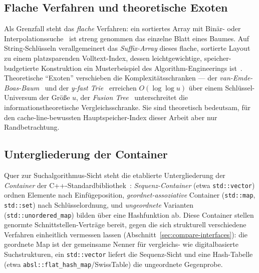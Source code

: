 \subsection{Flache Verfahren und theoretische Exoten}\label{ssec:flat-exotic}
Als Grenzfall steht das \emph{flache} Verfahren: ein sortiertes Array mit Binär- oder
Interpolationssuche~\cite{knuth1998taocp3} ist streng genommen das einzelne Blatt eines Baumes. Auf
String-Schlüsseln verallgemeinert das \emph{Suffix-Array} dieses flache, sortierte Layout zu einem
platzsparenden Volltext-Index, dessen leichtgewichtige, speicher-budgetierte Konstruktion ein
Musterbeispiel des Algorithm-Engineerings ist~\cite{manzini2002suffixarray}. Theoretische
\enquote{Exoten} verschieben die Komplexitätsschranken --- der
\emph{van-Emde-Boas-Baum}~\cite{vanemdeboas1975} und der \emph{y-fast Trie}~\cite{willard1983yfast}
erreichen $O(\log\log u)$ über einem Schlüssel-Universum der Größe $u$, der
\emph{Fusion Tree}~\cite{fredman1993fusion} unterschreitet die informationstheoretische
Vergleichsschranke. Sie sind theoretisch bedeutsam, für den cache-line-bewussten Hauptspeicher-Index
dieser Arbeit aber nur Randbetrachtung.

\subsection{Untergliederung der Container}\label{ssec:container-taxonomy}
Quer zur Suchalgorithmus-Sicht steht die etablierte Untergliederung der \emph{Container} der
C++-Standardbibliothek~\cite{iso_cpp}: \emph{Sequenz-Container} (etwa \texttt{std::vector}) ordnen
Elemente nach Einfügeposition, \emph{geordnet-assoziative} Container (\texttt{std::map},
\texttt{std::set}) nach Schlüsselordnung, und \emph{ungeordnete} Varianten
(\texttt{std::unordered\_map}) bilden über eine Hashfunktion ab. Diese Container stellen genormte
Schnittstellen-Verträge bereit, gegen die sich strukturell verschiedene Verfahren einheitlich
vermessen lassen (Abschnitt~\ref{sec:compare-interfaces}): die geordnete Map ist der gemeinsame
Nenner für vergleichs- wie digitalbasierte Suchstrukturen, ein \texttt{std::vector} liefert die
Sequenz-Sicht und eine Hash-Tabelle (etwa \texttt{absl::flat\_hash\_map}/SwissTable) die ungeordnete
Gegenprobe.

